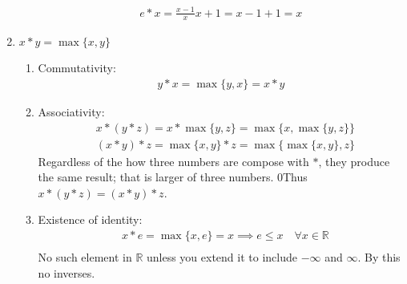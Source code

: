 \documentclass[nohyper,nobib]{tufte-handout}
\theoremstyle{definition}
\theoremstyle{remark}
\begin{document}
\begin{enumerate}
\begin{enumerate}[i]
\begin{align}
                    e * x = \frac{x-1}{x}x + 1 = x - 1 + 1 = x
                \end{align}
        \end{enumerate}
    \item $x * y = \max{\{x, y}\}$
        \begin{enumerate}[I]
            \item Commutativity:
                \begin{align}
                    y * x = \max{\{y, x\}} = x * y
                \end{align}
            \item Associativity:
                \begin{align}
                    &x * (y * z) = x * \max{\{y, z\}} = \max{\{x, \max{\{y, z\}} \}} \nonumber \\
                    &(x * y) * z = \max{\{x, y\}} * z = \max{\{\max{\{x, y\}}, z \}}
                \end{align}
                Regardless of the how three numbers are compose with $*$, they produce the same result; that is larger of three numbers. 0Thus $x * (y * z) = (x * y) * z$.
            \item Existence of identity:
                \begin{align}
                    &x * e = \max{\{x, e\}} = x \implies e \leq x \quad\forall x \in \mathbb{R} \nonumber \\
                \end{align}
                No such element in $\mathbb{R}$ unless you extend it to include $-\infty$ and $\infty$. By this no inverses.
        \end{enumerate}
\end{enumerate}
\end{document}
